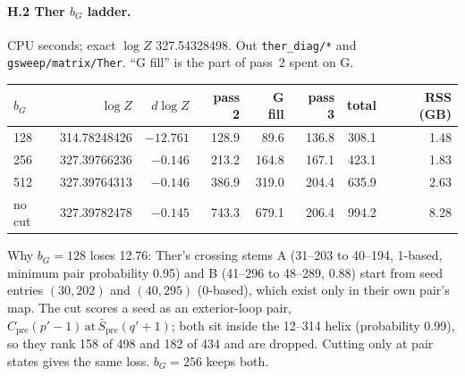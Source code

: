 \documentclass[11pt]{article}
\begin{document}
\paragraph{H.2 Ther $b_G$ ladder.} CPU seconds; exact $\log Z$ 327.54328498. Out \texttt{ther\_diag/*} and \texttt{gsweep/matrix/Ther}. ``G fill'' is the part of pass~2 spent on G.
\begin{center}
\small
\begin{tabular}{@{}lrrrrrrr@{}}
\toprule
$b_G$ & $\log Z$ & $d\log Z$ & pass 2 & G fill & pass 3 & total & RSS (GB) \\
\midrule
128 & 314.78248426 & $-12.761$ & 128.9 & 89.6 & 136.8 & 308.1 & 1.48 \\
256 & 327.39766236 & $-0.146$ & 213.2 & 164.8 & 167.1 & 423.1 & 1.83 \\
512 & 327.39764313 & $-0.146$ & 386.9 & 319.0 & 204.4 & 635.9 & 2.63 \\
no cut & 327.39782478 & $-0.145$ & 743.3 & 679.1 & 206.4 & 994.2 & 8.28 \\
\bottomrule
\end{tabular}
\end{center}
Why $b_G=128$ loses 12.76: Ther's crossing stems A (31--203 to 40--194, 1-based, minimum pair probability 0.95) and B (41--296 to 48--289, 0.88) start from seed entries $(30,202)$ and $(40,295)$ (0-based), which exist only in their own pair's map. The cut scores a seed as an exterior-loop pair, $C_{\mathrm{pre}}(p'-1)\,\mathrm{at}\,\bar S_{\mathrm{pre}}(q'+1)$; both sit inside the 12--314 helix (probability 0.99), so they rank 158 of 498 and 182 of 434 and are dropped. Cutting only at pair states gives the same loss. $b_G=256$ keeps both.
\end{document}
